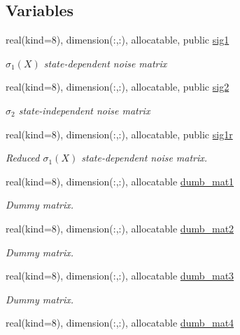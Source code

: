 \subsection*{Variables}
\begin{DoxyCompactItemize}
\item 
real(kind=8), dimension(\+:,\+:), allocatable, public \hyperlink{namespacesigma_a0aa2ecf44409fa5bc486137f146dfccc}{sig1}
\begin{DoxyCompactList}\small\item\em $\sigma_1(X)$ state-\/dependent noise matrix \end{DoxyCompactList}\item 
real(kind=8), dimension(\+:,\+:), allocatable, public \hyperlink{namespacesigma_a7a2602ed785ed3a15dbac6e6b0dfce02}{sig2}
\begin{DoxyCompactList}\small\item\em $\sigma_2$ state-\/independent noise matrix \end{DoxyCompactList}\item 
real(kind=8), dimension(\+:,\+:), allocatable, public \hyperlink{namespacesigma_a1264db44a7cd295a43de11460bcb5bbe}{sig1r}
\begin{DoxyCompactList}\small\item\em Reduced $\sigma_1(X)$ state-\/dependent noise matrix. \end{DoxyCompactList}\item 
real(kind=8), dimension(\+:,\+:), allocatable \hyperlink{namespacesigma_ab1b904a05acf6ebc4f8a35ad55f5b9b6}{dumb\+\_\+mat1}
\begin{DoxyCompactList}\small\item\em Dummy matrix. \end{DoxyCompactList}\item 
real(kind=8), dimension(\+:,\+:), allocatable \hyperlink{namespacesigma_a74726cc22665d4fde608f992a262f04e}{dumb\+\_\+mat2}
\begin{DoxyCompactList}\small\item\em Dummy matrix. \end{DoxyCompactList}\item 
real(kind=8), dimension(\+:,\+:), allocatable \hyperlink{namespacesigma_aa1cf7af9d091c183b2308f0f65786909}{dumb\+\_\+mat3}
\begin{DoxyCompactList}\small\item\em Dummy matrix. \end{DoxyCompactList}\item 
real(kind=8), dimension(\+:,\+:), allocatable \hyperlink{namespacesigma_a74080d7fa465ba8581e0b40c20170d5f}{dumb\+\_\+mat4}

\end{DoxyCompactItemize}
